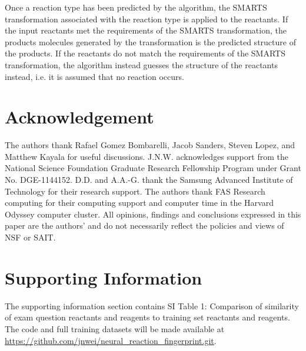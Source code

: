 Once a reaction type has been predicted by the algorithm, the SMARTS transformation associated with the reaction type is applied to the reactants. If the input reactants met the requirements of the SMARTS transformation, the products molecules generated by the transformation is the predicted structure of the products. If the reactants do not match the requirements of the SMARTS transformation, the algorithm instead guesses the structure of the reactants instead, i.e. it is assumed that no reaction occurs. 

\section{Acknowledgement}
The authors thank Rafael Gomez Bombarelli, Jacob Sanders, Steven Lopez, and Matthew Kayala for useful discussions. J.N.W. acknowledges support from the National Science Foundation Graduate Research Fellowship Program under Grant No. DGE-1144152. D.D. and A.A.-G. thank the Samsung Advanced Institute of Technology for their research support. The authors thank FAS Research computing for their computing support and computer time in the Harvard Odyssey computer cluster. All opinions, findings and conclusions expressed in this paper are the authors' and do not necessarily reflect the policies and views of NSF or SAIT.

\section{Supporting Information}
The supporting information section contains SI Table 1: Comparison of similarity of exam question reactants and reagents to training set reactants and reagents. The code and full training datasets will be made available at \url{https://github.com/jnwei/neural_reaction_fingerprint.git}.


